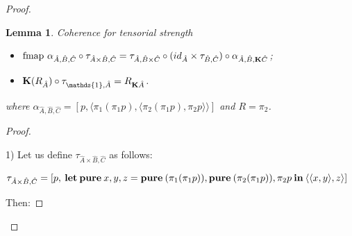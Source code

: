 \documentclass[a4paper]{article}
\newtheorem{lemma}{Lemma}
\begin{document}
\begin{proof}
\begin{lemma} Coherence for tensorial strength

  \begin{itemize}
    \item $\text{fmap } \alpha_{\hat{A},\hat{B},\hat{C}} \circ \tau_{\hat{A} \times \hat{B}, \hat{C}} = \tau_{\hat{A}, \hat{B} \times \hat{C}} \circ (id_{\hat{A}} \times \tau_{\hat{B}, \hat{C}}) \circ \alpha_{\hat{A}, \hat{B}, {\bf K}\hat{C}}$;
    \item ${\bf K}(R_{\hat{A}}) \circ \tau_{\mathds{1}, \hat{A}} = R_{{\bf K}\hat{A}}$.
  \end{itemize}
  where $\alpha_{\hat{A},\hat{B},\hat{C}} = [p, \langle \pi_1 (\pi_1 p), \langle \pi_2 (\pi_1 p), \pi_2 p \rangle \rangle]$ and
  $R = \pi_2$.
\end{lemma}

\begin{proof}
  $ $

1) Let us define $\tau_{\hat{A} \times \hat{B}, \hat{C}}$ as follows:

$\tau_{\hat{A} \times \hat{B}, \hat{C}} = [p, {\bf \: let \: pure \:} x,y,z = {\bf pure\:} (\pi_1 (\pi_1 p)), {\bf pure \:} (\pi_2 (\pi_1 p)), \pi_2 p {\: \bf in \:} \langle \langle x,y \rangle, z \rangle]$

\vspace{\baselineskip}

Then:

\vspace{\baselineskip}


\end{proof}
\end{proof}
\end{document}
